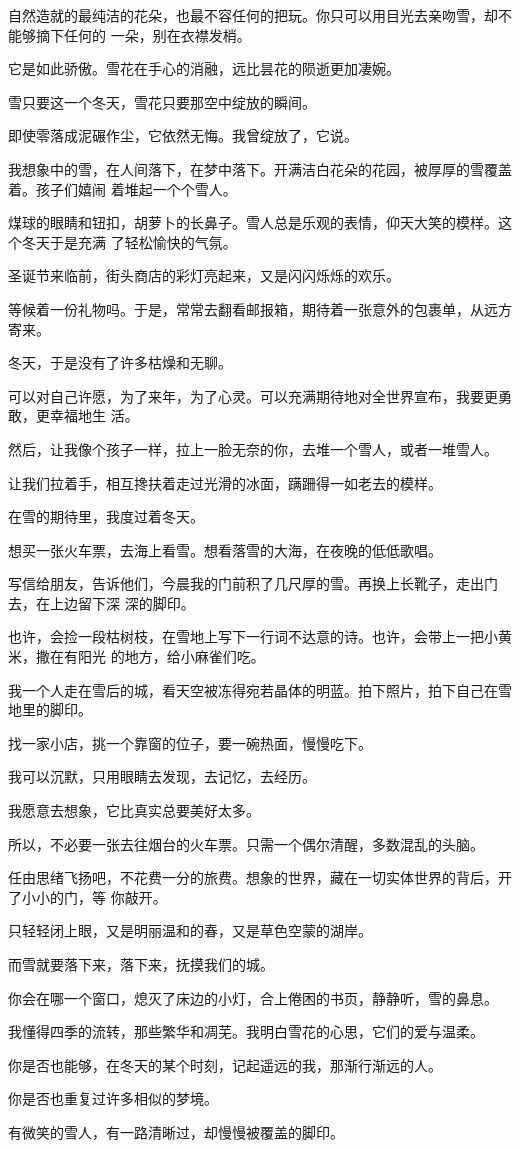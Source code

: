 \documentclass[12pt,a4paper]{article}
\begin{document}
		自然造就的最纯洁的花朵，也最不容任何的把玩。你只可以用目光去亲吻雪，却不能够摘下任何的
	一朵，别在衣襟发梢。

		它是如此骄傲。雪花在手心的消融，远比昙花的陨逝更加凄婉。\par
		雪只要这一个冬天，雪花只要那空中绽放的瞬间。\par
		即使零落成泥碾作尘，它依然无悔。我曾绽放了，它说。

		我想象中的雪，在人间落下，在梦中落下。开满洁白花朵的花园，被厚厚的雪覆盖着。孩子们嬉闹
	着堆起一个个雪人。

		煤球的眼睛和钮扣，胡萝卜的长鼻子。雪人总是乐观的表情，仰天大笑的模样。这个冬天于是充满
	了轻松愉快的气氛。

		圣诞节来临前，街头商店的彩灯亮起来，又是闪闪烁烁的欢乐。\par
		等候着一份礼物吗。于是，常常去翻看邮报箱，期待着一张意外的包裹单，从远方寄来。\par
		冬天，于是没有了许多枯燥和无聊。

		可以对自己许愿，为了来年，为了心灵。可以充满期待地对全世界宣布，我要更勇敢，更幸福地生
	活。

		然后，让我像个孩子一样，拉上一脸无奈的你，去堆一个雪人，或者一堆雪人。\par
		让我们拉着手，相互搀扶着走过光滑的冰面，蹒跚得一如老去的模样。

		在雪的期待里，我度过着冬天。

		想买一张火车票，去海上看雪。想看落雪的大海，在夜晚的低低歌唱。

		写信给朋友，告诉他们，今晨我的门前积了几尺厚的雪。再换上长靴子，走出门去，在上边留下深
	深的脚印。

		也许，会捡一段枯树枝，在雪地上写下一行词不达意的诗。也许，会带上一把小黄米，撒在有阳光
	的地方，给小麻雀们吃。

		我一个人走在雪后的城，看天空被冻得宛若晶体的明蓝。拍下照片，拍下自己在雪地里的脚印。\par
		找一家小店，挑一个靠窗的位子，要一碗热面，慢慢吃下。\par
		我可以沉默，只用眼睛去发现，去记忆，去经历。


		我愿意去想象，它比真实总要美好太多。\par
		所以，不必要一张去往烟台的火车票。只需一个偶尔清醒，多数混乱的头脑。

		任由思绪飞扬吧，不花费一分的旅费。想象的世界，藏在一切实体世界的背后，开了小小的门，等
	你敲开。

		只轻轻闭上眼，又是明丽温和的春，又是草色空蒙的湖岸。\par
		而雪就要落下来，落下来，抚摸我们的城。\par
		你会在哪一个窗口，熄灭了床边的小灯，合上倦困的书页，静静听，雪的鼻息。\par
		我懂得四季的流转，那些繁华和凋芜。我明白雪花的心思，它们的爱与温柔。\par
		你是否也能够，在冬天的某个时刻，记起遥远的我，那渐行渐远的人。\par
		你是否也重复过许多相似的梦境。\par
		有微笑的雪人，有一路清晰过，却慢慢被覆盖的脚印。
\end{document}
